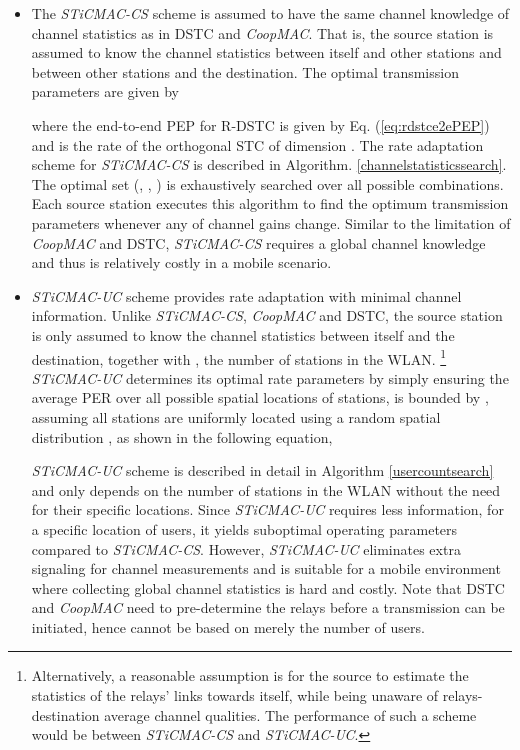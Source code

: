 \documentclass[peerreview,draftcls,onecolumn,12pt,a4paper]{IEEEtran}
\begin{document}
\begin{itemize}
    \item The  \emph{STiCMAC-CS} scheme is assumed to have the same channel knowledge of channel statistics as
   in DSTC and {\em CoopMAC}. That is, the source station  is assumed to know the
    channel statistics between itself and other stations and
    between other stations and the destination. The optimal transmission
    parameters  are given by

where the end-to-end PEP for R-DSTC is given by Eq.
(\ref{eq:rdstce2ePEP}) and  is the rate of the orthogonal STC
of dimension . The rate adaptation scheme for \emph{STiCMAC-CS}
is described in Algorithm. \ref{channelstatisticssearch}. The
optimal set (, , ) is exhaustively searched
over all possible combinations. Each source station executes this
algorithm to find the optimum transmission parameters whenever any
of channel gains change. Similar to the limitation of {\em
CoopMAC} and DSTC, \emph{STiCMAC-CS} requires a global channel
knowledge and thus is relatively costly in a mobile scenario.

\item \emph{STiCMAC-UC} scheme provides rate adaptation with
minimal channel information. Unlike \emph{STiCMAC-CS}, {\em
CoopMAC} and DSTC, the source station  is only assumed to know
the channel statistics between itself and the destination,
together with , the number of stations in the WLAN.
\footnote{Alternatively, a reasonable assumption is for the source
to estimate  the statistics of the relays' links towards itself,
while being unaware of relays-destination average channel
qualities. The performance of such a scheme would be between {\em
STiCMAC-CS} and {\em STiCMAC-UC}.} \emph{STiCMAC-UC} determines
its optimal rate parameters by simply ensuring the average PER
over all possible spatial locations of stations, is bounded by
, assuming all stations are uniformly located using a
random spatial distribution , as shown in the following
equation,


\emph{STiCMAC-UC} scheme is described in detail in Algorithm
\ref{usercountsearch} and only depends on the number of stations
in the WLAN without the need for their specific locations. Since
\emph{STiCMAC-UC} requires less information, for a specific
location of users, it yields suboptimal operating parameters
compared to \emph{STiCMAC-CS}. However, \emph{STiCMAC-UC}
eliminates extra signaling for channel measurements and is
suitable for a mobile environment where collecting global channel
statistics is hard and costly. Note that DSTC and {\em CoopMAC}
need to pre-determine the relays before a transmission can be
initiated, hence cannot be based on merely the number of users.
\end{itemize}
\end{document}
